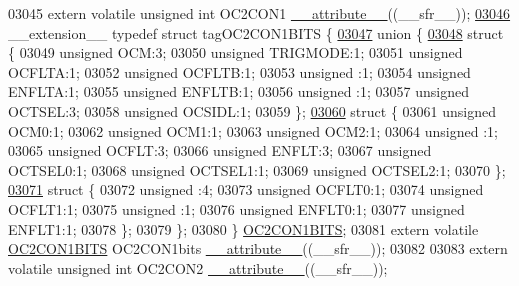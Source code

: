 \begin{DoxyCode}
03045 \textcolor{keyword}{extern} \textcolor{keyword}{volatile} \textcolor{keywordtype}{unsigned} \textcolor{keywordtype}{int}  OC2CON1 \hyperlink{a00015_a493c46f03454991ccc5aa7a6e1dfb2a7}{\_\_attribute\_\_}((\_\_sfr\_\_));
\hypertarget{a00015_source_l03046}{}\hyperlink{a00014}{03046} \_\_extension\_\_ \textcolor{keyword}{typedef} \textcolor{keyword}{struct }tagOC2CON1BITS \{
\hypertarget{a00015_source_l03047}{}\hyperlink{a00015}{03047}   \textcolor{keyword}{union }\{
\hypertarget{a00015_source_l03048}{}\hyperlink{a00015}{03048}     \textcolor{keyword}{struct }\{
03049       \textcolor{keywordtype}{unsigned} OCM:3;
03050       \textcolor{keywordtype}{unsigned} TRIGMODE:1;
03051       \textcolor{keywordtype}{unsigned} OCFLTA:1;
03052       \textcolor{keywordtype}{unsigned} OCFLTB:1;
03053       \textcolor{keywordtype}{unsigned} :1;
03054       \textcolor{keywordtype}{unsigned} ENFLTA:1;
03055       \textcolor{keywordtype}{unsigned} ENFLTB:1;
03056       \textcolor{keywordtype}{unsigned} :1;
03057       \textcolor{keywordtype}{unsigned} OCTSEL:3;
03058       \textcolor{keywordtype}{unsigned} OCSIDL:1;
03059     \};
\hypertarget{a00015_source_l03060}{}\hyperlink{a00015}{03060}     \textcolor{keyword}{struct }\{
03061       \textcolor{keywordtype}{unsigned} OCM0:1;
03062       \textcolor{keywordtype}{unsigned} OCM1:1;
03063       \textcolor{keywordtype}{unsigned} OCM2:1;
03064       \textcolor{keywordtype}{unsigned} :1;
03065       \textcolor{keywordtype}{unsigned} OCFLT:3;
03066       \textcolor{keywordtype}{unsigned} ENFLT:3;
03067       \textcolor{keywordtype}{unsigned} OCTSEL0:1;
03068       \textcolor{keywordtype}{unsigned} OCTSEL1:1;
03069       \textcolor{keywordtype}{unsigned} OCTSEL2:1;
03070     \};
\hypertarget{a00015_source_l03071}{}\hyperlink{a00015}{03071}     \textcolor{keyword}{struct }\{
03072       \textcolor{keywordtype}{unsigned} :4;
03073       \textcolor{keywordtype}{unsigned} OCFLT0:1;
03074       \textcolor{keywordtype}{unsigned} OCFLT1:1;
03075       \textcolor{keywordtype}{unsigned} :1;
03076       \textcolor{keywordtype}{unsigned} ENFLT0:1;
03077       \textcolor{keywordtype}{unsigned} ENFLT1:1;
03078     \};
03079   \};
03080 \} \hyperlink{a00014_de/d85/a00618}{OC2CON1BITS};
03081 \textcolor{keyword}{extern} \textcolor{keyword}{volatile} \hyperlink{a00014_de/d85/a00618}{OC2CON1BITS} OC2CON1bits \hyperlink{a00015_a493c46f03454991ccc5aa7a6e1dfb2a7}{\_\_attribute\_\_}((\_\_sfr\_\_));
03082 
03083 \textcolor{keyword}{extern} \textcolor{keyword}{volatile} \textcolor{keywordtype}{unsigned} \textcolor{keywordtype}{int}  OC2CON2 \hyperlink{a00015_a493c46f03454991ccc5aa7a6e1dfb2a7}{\_\_attribute\_\_}((\_\_sfr\_\_));

\end{DoxyCode}
